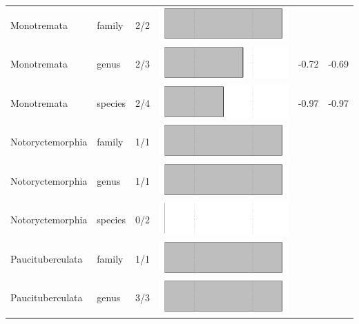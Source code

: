 \begin{longtable}{lL{1.8cm}C{2cm}lcc}
  Monotremata & family & 2/2 & \includegraphics[width=0.20\linewidth, height=0.05\linewidth]{Supplementaries/Figures/MissingMammals/Results_1c/Table_figures/bar43.pdf} &   &   \\ 
  Monotremata & genus & 2/3 & \includegraphics[width=0.20\linewidth, height=0.05\linewidth]{Supplementaries/Figures/MissingMammals/Results_1c/Table_figures/bar44.pdf} & -0.72 & -0.69 \\ 
  Monotremata & species & 2/4 & \includegraphics[width=0.20\linewidth, height=0.05\linewidth]{Supplementaries/Figures/MissingMammals/Results_1c/Table_figures/bar45.pdf} & -0.97 & -0.97 \\ 
  Notoryctemorphia & family & 1/1 & \includegraphics[width=0.20\linewidth, height=0.05\linewidth]{Supplementaries/Figures/MissingMammals/Results_1c/Table_figures/bar46.pdf} &   &   \\ 
  Notoryctemorphia & genus & 1/1 & \includegraphics[width=0.20\linewidth, height=0.05\linewidth]{Supplementaries/Figures/MissingMammals/Results_1c/Table_figures/bar47.pdf} &   &   \\ 
  Notoryctemorphia & species & 0/2 & \includegraphics[width=0.20\linewidth, height=0.05\linewidth]{Supplementaries/Figures/MissingMammals/Results_1c/Table_figures/bar48.pdf} &   &   \\ 
  Paucituberculata & family & 1/1 & \includegraphics[width=0.20\linewidth, height=0.05\linewidth]{Supplementaries/Figures/MissingMammals/Results_1c/Table_figures/bar49.pdf} &   &   \\ 
  Paucituberculata & genus & 3/3 & \includegraphics[width=0.20\linewidth, height=0.05\linewidth]{Supplementaries/Figures/MissingMammals/Results_1c/Table_figures/bar50.pdf} &   &   \\ 

\end{longtable}
